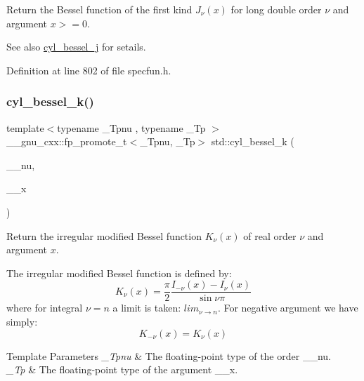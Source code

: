 Return the Bessel function of the first kind $ J_{\nu}(x) $ for {\ttfamily long double} order $ \nu $ and argument $ x >= 0 $.

\begin{DoxySeeAlso}{See also}
\hyperlink{group__cxx17__math__spec__func_ga644f7eb975809674db88768f2f115744}{cyl\+\_\+bessel\+\_\+j} for setails. 
\end{DoxySeeAlso}


Definition at line 802 of file specfun.\+h.

\mbox{\label{group__cxx17__math__spec__func_gac73d664b8e7ceba7f8e786c93e97a084}} 
\subsubsection{\texorpdfstring{cyl\+\_\+bessel\+\_\+k()}{cyl\_bessel\_k()}}
{\footnotesize\ttfamily template$<$typename \+\_\+\+Tpnu , typename \+\_\+\+Tp $>$ \\
\+\_\+\+\_\+gnu\+\_\+cxx\+::fp\+\_\+promote\+\_\+t$<$\+\_\+\+Tpnu, \+\_\+\+Tp$>$ std\+::cyl\+\_\+bessel\+\_\+k (\begin{DoxyParamCaption}\item[{\+\_\+\+Tpnu}]{\+\_\+\+\_\+nu,  }\item[{\+\_\+\+Tp}]{\+\_\+\+\_\+x }\end{DoxyParamCaption})\hspace{0.3cm}{\ttfamily [inline]}}

Return the irregular modified Bessel function $ K_{\nu}(x) $ of real order $ \nu $ and argument $ x $.

The irregular modified Bessel function is defined by\+: \[ K_{\nu}(x) = \frac{\pi}{2} \frac{I_{-\nu}(x) - I_{\nu}(x)}{\sin \nu\pi} \] where for integral $ \nu = n $ a limit is taken\+: $ lim_{\nu \to n} $. For negative argument we have simply\+: \[ K_{-\nu}(x) = K_{\nu}(x) \]


\begin{DoxyTemplParams}{Template Parameters}
{\em \+\_\+\+Tpnu} & The floating-\/point type of the order {\ttfamily \+\_\+\+\_\+nu}. \\
\hline
{\em \+\_\+\+Tp} & The floating-\/point type of the argument {\ttfamily \+\_\+\+\_\+x}. \\
\hline
\end{DoxyTemplParams}

